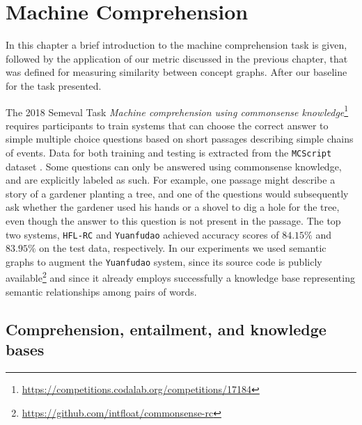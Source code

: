 \chapter{Machine Comprehension}
\label{chap:comprehension}
In this chapter a brief introduction to the machine comprehension task is given, followed by the application of our metric discussed in the previous chapter, that was defined for measuring similarity between concept graphs. After our baseline for the task presented.

The 2018 Semeval Task \textit{Machine comprehension using commonsense
	knowledge}\footnote{\url{https://competitions.codalab.org/competitions/17184}}
requires participants to train systems that can choose the
correct answer to simple multiple choice questions based on short
passages describing simple chains of events. Data for both training and
testing is extracted from the \texttt{MCScript} dataset
\cite{Ostermann:2018}. Some questions can only be
answered using commonsense knowledge, and are
explicitly labeled as such. For example, one passage might describe a
story of a gardener planting a tree, and one of the questions would
subsequently ask whether the gardener used his hands or a shovel to dig
a hole for the tree, even though the answer to this question is not
present in the passage. The top two systems, \texttt{HFL-RC}
\cite{Chen:2018} and
\texttt{Yuanfudao} \cite{Wang:2018} achieved accuracy scores of
$84.15\%$ and $83.95\%$ on the test data, respectively. In our experiments we used
semantic graphs to augment the \texttt{Yuanfudao} system, since its source
code is publicly
available\footnote{\url{https://github.com/intfloat/commonsense-rc}} and since it already employs successfully a
knowledge base representing semantic relationships among pairs of words.

\section{Comprehension, entailment, and knowledge bases}


